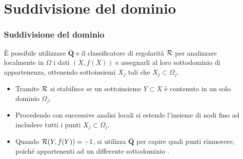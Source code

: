 \documentclass[10pt]{beamer}
\theoremstyle{definition}
\theoremstyle{plain}
\def\R{\mathbb R}
\def\Cal#1{{\cal #1}}
\def\line#1{\hbox to\hsize{#1}}
\begin{document}
\section{Suddivisione del dominio}
\begin{frame}
\frametitle{Suddivisione del dominio}


È possibile utilizzare $\bar{\bm Q}$ e il classificatore di regolarità $\Cal R$ per analizzare localmente in $\Omega$ i dati $(X, f(X))$ e assegnarli al loro sottodominio di appartenenza, ottenendo sottoinsiemi $X_j$ tali che $X_j\subset \Omega_j$.

\medskip

\begin{itemize} 
\item
Tramite $\Cal R$ si stabilisce se un sottoinsieme $Y \subset X$ è contenuto in un solo dominio $\Omega_j$.

\medskip

\item
Procedendo con successive analisi locali si  estende l’insieme di nodi fino ad includere tutti i punti $X_j\subset\Omega_j$.

\medskip

\item
Quando $\Cal R(Y, f(Y)) = -1$, si utilizza $\bar{\bm Q}$ per capire quali punti rimuovere, poiché  appartenenti ad un differente  sottodominio .
\end{itemize}
\end{frame}


\end{document}
